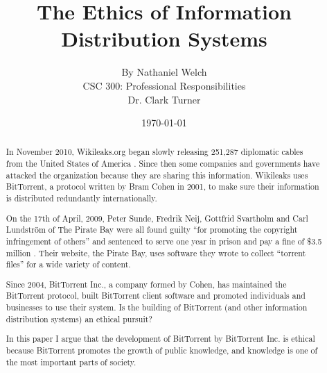 \documentclass[11pt]{article}
\begin{document}
\title{\vfill The Ethics of Information Distribution Systems} %
\author{
By Nathaniel Welch\vspace{10pt}\\
CSC 300: Professional Responsibilities\vspace{10pt}\\
Dr. Clark Turner\vspace{10pt}\\
}
\date{\today}

\maketitle

\vfill
\begin{abstract}
In November 2010, Wikileaks.org began slowly releasing 251,287 diplomatic cables from the United States of America \cite{cablegate}. Since then some companies and governments have attacked the organization because they are sharing this information. Wikileaks uses BitTorrent, a protocol written by Bram Cohen in 2001, to make sure their information is distributed redundantly internationally.

On the 17th of April, 2009, Peter Sunde, Fredrik Neij, Gottfrid Svartholm and Carl Lundström of The Pirate Bay were all found guilty ``for promoting the copyright infringement of others'' and sentenced to serve one year in prison and pay a fine of \$3.5 million \cite{tpbverdict}. Their website, the Pirate Bay, uses software they wrote to collect ``torrent files'' for a wide variety of content.

Since 2004, BitTorrent Inc., a company formed by Cohen, has maintained the BitTorrent protocol, built BitTorrent client software and promoted individuals and businesses to use their system. Is the building of BitTorrent (and other information distribution systems) an ethical pursuit?

In this paper I argue that the development of BitTorrent by BitTorrent Inc. is ethical because BitTorrent promotes the growth of public knowledge, and knowledge is one of the most important parts of society.
\end{abstract}

\thispagestyle{empty}
\newpage


\thispagestyle{empty}
\tableofcontents
\newpage
\end{document}
